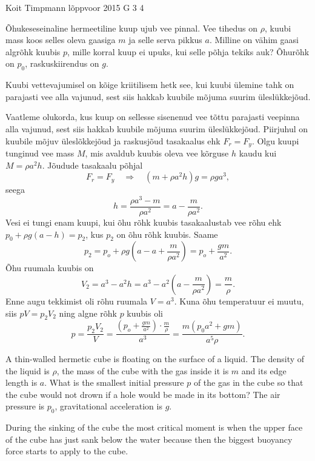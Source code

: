 {Koit Timpmann} %
{lõppvoor} %
{2015} %
{G 3} %
{4} %
{
\ifStatement
Õhukeseseinaline hermeetiline kuup ujub vee pinnal. Vee tihedus on $\rho$, kuubi mass koos selles oleva gaasiga $m$ ja selle serva pikkus $a$. Milline on vähim gaasi algrõhk kuubis $p$, mille korral kuup ei upuks, kui selle põhja tekiks auk? Õhurõhk on $p_0$, raskuskiirendus on $g$.
\fi


\ifHint
Kuubi vettevajumisel on kõige kriitilisem hetk see, kui kuubi ülemine tahk on parajasti vee alla vajunud, sest siis hakkab kuubile mõjuma suurim üleslükkejõud.
\fi


\ifSolution
Vaatleme olukorda, kus kuup on sellesse sisenenud vee tõttu parajasti veepinna alla vajunud, sest siis hakkab kuubile mõjuma suurim üleslükkejõud. Piirjuhul on kuubile mõjuv üleslõkkejõud ja raskusjõud tasakaalus ehk $F_r = F_y$. Olgu kuupi tunginud vee mass $M$, mis avaldub kuubis oleva vee kõrguse $h$ kaudu kui $M = \rho a^2h$. Jõudude tasakaalu põhjal
\[
F_r = F_y \quad\Rightarrow\quad (m + \rho a^2h)g=\rho ga^3,
\]
seega
\[
h = \frac{\rho a^3 - m}{\rho a^2} = a - \frac{m}{\rho a^2}.
\]
Vesi ei tungi enam kuupi, kui õhu rõhk kuubis tasakaalustab vee rõhu ehk $p_0 + \rho g(a-h) = p_2$, kus $p_2$ on õhu rõhk kuubis. Saame
\[
p_2 = p_o + \rho g\left(a - a + \frac{m}{\rho a^2}\right) = p_o + \frac{gm}{a^2}.
\]
Õhu ruumala kuubis on
\[
V_2 = a^3 - a^2h = a^3 - a^2\left(a - \frac{m}{\rho a^2}\right) = \frac{m}{\rho}.
\]
Enne augu tekkimist oli rõhu ruumala $V=a^3$. Kuna õhu temperatuur ei muutu, siis $pV = p_2V_2$ ning algne rõhk $p$ kuubis oli
\[
p = \frac{p_2V_2}{V} = \frac{ \left( p_o + \frac{gm}{a^2} \right) \cdot \frac{m}{\rho}}{a^3} = \frac{m(p_0a^2 + gm)}{a^5\rho}.
\]
\fi


\ifEngStatement
A thin-walled hermetic cube is floating on the surface of a liquid. The density of the liquid is $\rho$, the mass of the cube with the gas inside it is $m$ and its edge length is $a$. What is the smallest initial pressure $p$ of the gas in the cube so that the cube would not drown if a hole would be made in its bottom? The air pressure is $p_0$, gravitational acceleration is $g$.
\fi


\ifEngHint
During the sinking of the cube the most critical moment is when the upper face of the cube has just sank below the water because then the biggest buoyancy force starts to apply to the cube.
\fi


}
